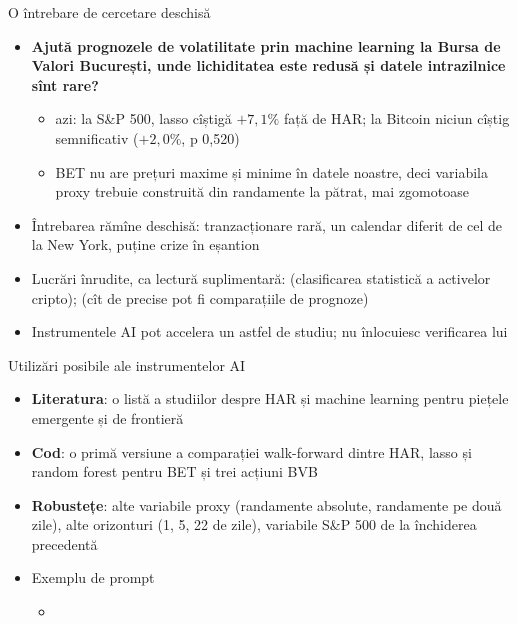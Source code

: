 \begin{frame}{O întrebare de cercetare deschisă}
\itemsize{\small}
\begin{itemize}
    \item \textbf{Ajută prognozele de volatilitate prin machine learning la Bursa de Valori București, unde lichiditatea este redusă și datele intrazilnice sînt rare?}
    \begin{itemize}
        \item azi: la S\&P 500, lasso cîștigă $+7{,}1\%$ față de HAR; la Bitcoin niciun cîștig semnificativ ($+2{,}0\%$, p 0{,}520)
        \item BET nu are prețuri maxime și minime în datele noastre, deci variabila proxy trebuie construită din randamente la pătrat, mai zgomotoase
    \end{itemize}
    \item Întrebarea rămîne deschisă: tranzacționare rară, un calendar diferit de cel de la New York, puține crize în eșantion
    \item Lucrări înrudite, ca lectură suplimentară:  (clasificarea statistică a activelor cripto);  (cît de precise pot fi comparațiile de prognoze)
    \item Instrumentele AI pot accelera un astfel de studiu; nu înlocuiesc verificarea lui 
\end{itemize}
\end{frame}

\begin{frame}{Utilizări posibile ale instrumentelor AI}
\itemsize{\small}
\begin{itemize}
    \item \textbf{Literatura}: o listă a studiilor despre HAR și machine learning pentru piețele emergente și de frontieră
    \item \textbf{Cod}: o primă versiune a comparației walk-forward dintre HAR, lasso și random forest pentru BET și trei acțiuni BVB
    \item \textbf{Robustețe}: alte variabile proxy (randamente absolute, randamente pe două zile), alte orizonturi (1, 5, 22 de zile), variabile S\&P 500 de la închiderea precedentă
    \item Exemplu de prompt
    \begin{itemize}
        \item {}
    \end{itemize}
\end{itemize}
\end{frame}


